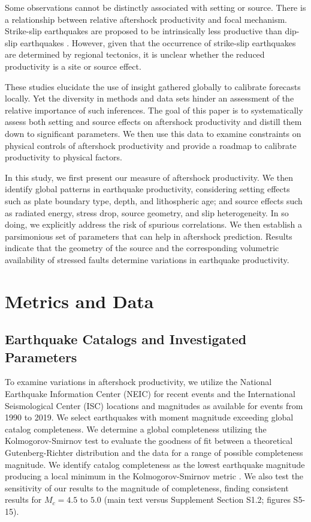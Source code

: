 \documentclass[draft, jgrga]{agujournal2018}
\begin{document}
Some observations cannot be distinctly associated with setting or source. There is a relationship between relative aftershock productivity and focal mechanism. Strike-slip earthquakes are proposed to be intrinsically less productive than dip-slip earthquakes \citep{Tahir2012, Tahir2014Aftershock2005, Tahir2015}. However, given that the occurrence of strike-slip earthquakes are determined by regional tectonics, it is unclear whether the reduced productivity is a site or source effect.

These studies elucidate the use of insight gathered globally to calibrate forecasts locally. Yet the diversity in methods and data sets hinder an assessment of the relative importance of such inferences. The goal of this paper is to systematically assess both setting and source effects on aftershock productivity and distill them down to significant parameters. We then use this data to examine constraints on physical controls of aftershock productivity and provide a roadmap to calibrate productivity to physical factors.

In this study, we first present our measure of aftershock productivity. We then identify global patterns in earthquake productivity, considering setting effects such as plate boundary type, depth, and lithospheric age; and source effects such as radiated energy, stress drop, source geometry, and slip heterogeneity. In so doing, we explicitly address the risk of spurious correlations. We then establish a parsimonious set of parameters that can help in aftershock prediction. Results indicate that the geometry of the source and the corresponding volumetric availability of stressed faults determine variations in earthquake productivity.

\section{Metrics and Data}

\subsection{Earthquake Catalogs and Investigated Parameters}

To examine variations in aftershock productivity, we utilize the National Earthquake Information Center (NEIC) for recent events and the International Seismological Center (ISC) locations and magnitudes as available for events from 1990 to 2019. We select earthquakes with moment magnitude exceeding global catalog completeness. We determine a global completeness utilizing the Kolmogorov-Smirnov test to evaluate the goodness of fit between a theoretical Gutenberg-Richter distribution and the data for a range of possible completeness magnitude. We identify catalog completeness as the lowest earthquake magnitude producing a local minimum in the Kolmogorov-Smirnov metric \citep[following][]{Clauset2009Power-lawData, Goebel2017WhatExperiments}. We also test the sensitivity of our results to the magnitude of
completeness, finding consistent results for $M_c= 4.5$ to $5.0$ (main text versus Supplement Section S1.2; figures S5-15).
\end{document}
